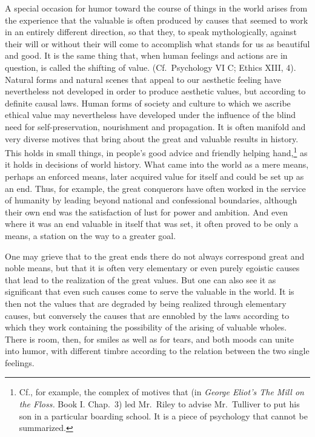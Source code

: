 \documentclass[12pt]{book}
\newcommand{\opage}[1]{\marginnote{\footnotesize\textit{[#1]}}}
\begin{document}
A special occasion for humor toward the course of things in the world arises from
the experience that the valuable is often produced by causes that seemed to work in
an entirely different direction, so that they, to speak mythologically, against their
will or without their will come to accomplish what stands for us as beautiful and
good. It is the same thing that, when human feelings and actions are in question, is
called the shifting of value. (Cf.\ Psychology VI C; Ethics XIII, 4). Natural forms
and natural scenes that \opage{72}appeal to our aesthetic feeling have nevertheless
not developed in order to produce aesthetic values, but according to definite causal
laws. Human forms of society and culture to which we ascribe ethical value may
nevertheless have developed under the influence of the blind need for
self-preservation, nourishment and propagation. It is often manifold and very
diverse motives that bring about the great and valuable results in history. This
holds in small things, in people's good advice and friendly helping
hand,\footnote{Cf., for example, the complex of motives that (in \textit{George
Eliot's The Mill on the Floss.} Book I. Chap.~3) led Mr.~Riley to advise
Mr.~Tulliver to put his son in a particular boarding school. It is a piece of
psychology that cannot be summarized.} as it holds in decisions of world history.
What came into the world as a mere means, perhaps an enforced means, later acquired
value for itself and could be set up as an end. Thus, for example, the great
conquerors have often worked in the service of humanity by leading beyond national
and confessional boundaries, although their own end was the satisfaction of lust
for power and ambition. And even where it was an end valuable in itself that was
set, it often proved to be only a means, a station on the way to a greater goal.

One may grieve that to the great ends there do not always correspond great and noble
means, but that it is often very elementary or even purely egoistic causes that lead
to the realization of the great values. But one can also see it as significant that
even such causes come to serve the valuable in the world. It is then not the values
that are degraded by being realized through elementary causes, but conversely the
causes that are ennobled by the laws according to which they work containing the
possibility of the arising of valuable wholes. There is room, then, for smiles as
well as for tears, and both moods can unite into humor, with different timbre
according to the relation between the two single feelings.
\end{document}
